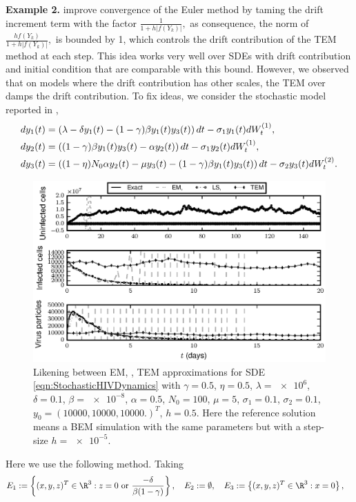 	
{\textbf{Example 2.}}
	\citeauthor{Hutzenthaler2012a} improve convergence of the Euler method by taming the drift increment term with 
	the factor
	$
	\frac{1}{1 + h |f(Y_k)|},
	$
	as consequence, the norm of  
	$
	\frac{h f(Y_k)}{1 + h |f(Y_k)|},
	$ is bounded by 1, which  controls the drift contribution of the TEM method at each step. This idea works very well
	over SDEs with drift contribution and initial condition that are comparable with this bound. However, we observed
	that on models where the	drift contribution has other scales, the TEM over damps the drift contribution. To fix
	ideas, we consider the	stochastic model reported in \cite{Dalal2008},
	\begin{align}\label{eqn:StochasticHIVDynamics}
	dy_1(t) &=
	\left(
	\lambda -\delta y_1(t) - (1 - \gamma) \beta y_1(t) y_3(t)
	\right)dt
	-\sigma_1 y_1(t) dW^{(1)}_t, 
	\notag \\
	dy_2(t) &= 
	\left(
	(1- \gamma) \beta y_1(t) y_3(t) - \alpha y_2(t) 
	\right)dt
	-\sigma_1 y_2(t) dW^{(1)}_t, 
	\\
	dy_3(t) & = 
	\left(
	(1 - \eta) N_0 \alpha y_2(t) 
	-\mu y_3(t)
	-(1 - \gamma ) \beta y_1(t) y_3(t) 
	\right)dt
	- \sigma_2 y_3(t) dW^{(2)}_t.
	\notag
	\end{align}	
	\begin{figure}[h!]
		\centering
		\includegraphics{./InternalHIVDynamics5e-1}
		\caption{
			Likening between EM, \SM, TEM approximations for SDE \eqref{eqn:StochasticHIVDynamics} with
			$\gamma = \num{0.5}$,
			$\eta = \num{0.5}$,
			$\lambda = \num{e6}$, 
			$\delta = \num{0.1}$,
			$\beta = \num{e-8}$,
			$\alpha = \num{0.5}$,
			$N_0= \num{100}$,
			$\mu = \num{5}$,
			$\sigma_1 = \num{0.1}$,
			$\sigma_2 = \num{0.1} $,
			$y_0 = (
				\num{10000},%
				\num{10000},%
				\num{10000}.%
			)^T$,
			$h=\num{0.5}$.
			Here the reference solution means a BEM simulation
			with the same parameters but with a step-size $h=\num{e-5}$.
		}
		\label{fig:InternalHIVDynamics5e-1}
	\end{figure} 
	Here we use the following \SM method. Taking 
	\begin{align*}
		E_1&:=	\left\{
			(x,y,z)^T \in \R^3:
			z=0 \text{ or }
			\frac{-\delta}{\beta(1-\gamma)}
		\right\}, \quad
		E_2:=	\emptyset, \quad   %
		E_3:=  \left\{ (x,y,z)^T \in \R^3: x=0 \right\},
	\end{align*}
	
